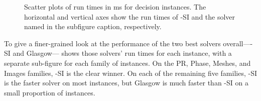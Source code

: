 \begin{figure}[htb]
{    }
    \caption{Scatter plots of run times in ms for decision instances.
            The horizontal and vertical axes show the run times of \McSplit-SI and the
            solver named in the subfigure caption, respectively.}
    \label{figure:si-decision-scatter}
\end{figure}

To give a finer-grained look at the performance of the two best solvers overall---\McSplit-SI and
Glasgow--- shows those solvers' run times for each
instance, with a separate sub-figure for each family of instances.  On the PR, Phase, Meshes,
and Images families, \McSplit-SI is the clear winner.   On each of
the remaining five families, \McSplit-SI is the faster solver on most instances, but Glasgow
is much faster than \McSplit-SI on a small proportion of instances.

